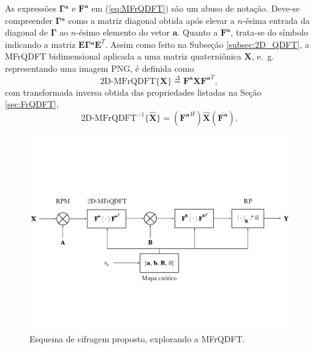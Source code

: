 As express\~oes $ \boldsymbol{\Gamma}\mathbf{^a} $ e $ \mathbf{F^a} $ em (\ref{eq:MFrQDFT}) s\~ao um abuso de nota\c c\~ao. Deve-se compreender $ \boldsymbol{\Gamma}\mathbf{^a} $ como a matriz diagonal obtida ap\'os elevar a $ n $-\'esima entrada da diagonal de $ \boldsymbol{\Gamma} $ ao $ n $-\'esimo elemento do vetor $ \mathbf{a} $. Quanto a $ \mathbf{F^a} $, trata-se do s\'imbolo indicando a matriz $ \mathbf{E} \boldsymbol{\Gamma}\mathbf{^a} \mathbf{E}^T $. Assim como feito na Subse\c c\~ao \ref{subsec:2D_QDFT}, a MFrQDFT bidimensional aplicada a uma matriz quaterni\^onica $ \mathbf{X} $, e.~g. representando uma imagem PNG, \'e definida como
\begin{equation}
\label{eq:2DMFrQDFT}
\text{2D-MFrQDFT}\{\mathbf{X} \} \overset{\Delta}{=} \mathbf{F^a} \mathbf{X} \mathbf{F^a}^T,
\end{equation}
com transformada inversa obtida das propriedades listadas na Se\c c\~ao \ref{sec:FrQDFT},
\begin{equation}
\label{eq:2DMFrQDFTinv}
\text{2D-MFrQDFT}^{-1}\{ \mathbf{\widehat{X}} \} = (\mathbf{F^a}^H) \mathbf{\widehat{X}} (\overline{\mathbf{F^a}}).
\end{equation}

\begin{figure}
	\centering
	\includegraphics[width=0.9\linewidth]{Figures/esquema_PT.pdf}
	\caption{Esquema de cifragem proposto, explorando a MFrQDFT.}
	\label{fig:cifragem}
\end{figure}

